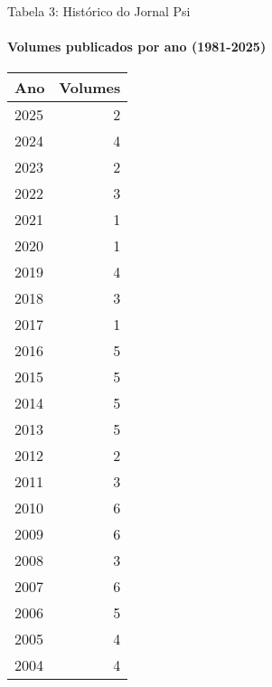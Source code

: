 \documentclass{beamer}
\begin{document}
\begin{frame}{Tabela 3: Histórico do Jornal Psi}
    \framesubtitle{Volumes publicados por ano (1981-2025)}
    \begin{multicols}{2}
    \tiny
    \begin{tabular}{l r}
        \toprule
        \textbf{Ano} & \textbf{Volumes} \\
        \midrule
        2025 & 2 \\
        2024 & 4 \\
        2023 & 2 \\
        2022 & 3 \\
        2021 & 1 \\
        2020 & 1 \\
        2019 & 4 \\
        2018 & 3 \\
        2017 & 1 \\
        2016 & 5 \\
        2015 & 5 \\
        2014 & 5 \\
        2013 & 5 \\
        2012 & 2 \\
        2011 & 3 \\
        2010 & 6 \\
        2009 & 6 \\
        2008 & 3 \\
        2007 & 6 \\
        2006 & 5 \\
        2005 & 4 \\
        2004 & 4 \\
        \bottomrule
    \end{tabular}
    
    \columnbreak
    

\end{multicols}
\end{frame}
\end{document}
